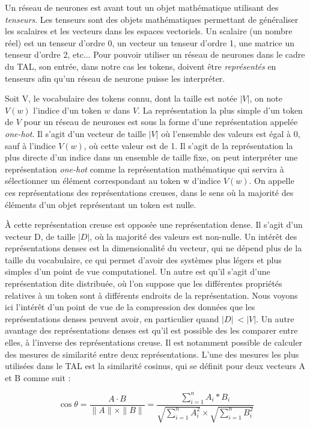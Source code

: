 \documentclass[citation\_needed]{subfiles}
\begin{document}
Un réseau de neurones est avant tout un objet mathématique utilisant des \emph{tenseurs}. Les tenseurs sont des objets mathématiques permettant de généraliser les scalaires et les vecteurs dans les espaces vectoriels. Un scalaire (un nombre réel) est un tenseur d'ordre 0, un vecteur un tenseur d'ordre 1, une matrice un tenseur d'ordre 2, etc... Pour pouvoir utiliser un réseau de neurones dans le cadre du TAL, son entrée, dans notre cas les tokens, doivent être \emph{représentés} en tenseurs afin qu'un réseau de neurone puisse les interpréter.

Soit V, le vocabulaire des tokens connu, dont la taille est notée $|V|$, on note $V(w)$ l'indice d'un token $w$ dans $V$. La représentation la plus simple d'un token de $V$ pour un réseau de neurones est sous la forme d'une représentation appelée \textit{one-hot}. Il s'agit d'un vecteur de taille $|V|$ où l'ensemble des valeurs est égal à 0, sauf à l'indice $V(w)$, où cette valeur est de 1. Il s'agit de la représentation la plus directe d'un indice dans un ensemble de taille fixe, on peut interpréter une représentation \textit{one-hot} comme la représentation mathématique qui servira à sélectionner un élément correspondant au token w d'indice $V(w)$. On appelle ces représentations des représentations creuses, dans le sens où la majorité des éléments d'un objet représentant un token est nulle.

À cette représentation creuse est opposée une représentation dense. Il s'agit d'un vecteur D, de taille $|D|$, où la majorité des valeurs est non-nulle. Un intérêt des représentations denses est la dimensionalité du vecteur, qui ne dépend plus de la taille du vocabulaire, ce qui permet d'avoir des systèmes plus légers et plus simples d'un point de vue computationel. Un autre est qu'il s'agit d'une représentation dite distribuée, où l'on suppose que les différentes propriétés relatives à un token sont à différents endroits de la représentation. Nous voyons ici l'intérêt d'un point de vue de la compression des données que les représentations denses peuvent avoir, en particulier quand $|D|\ < |V|$. Un autre avantage des représentations denses est qu'il est possible des les comparer entre elles, à l'inverse des représentations creuse. Il est notamment possible de calculer des mesures de similarité entre deux représentations. L'une des mesures les plus utilisées dans le TAL est la similarité cosinus, qui se définit pour deux vecteurs A et B comme suit :

\begin{equation}\label{eq:cosine-similarity}
\cos \theta = \frac{A \cdot B}{\|A\| \times \|B\|} = \frac{\sum_{i=1}^{n}A_{i} * B_{i}}{\sqrt{\sum_{i=1}^{n}A_{i}^{2}} \times \sqrt{\sum_{i=1}^{n}B_{i}^{2}}}
\end{equation}
\end{document}

